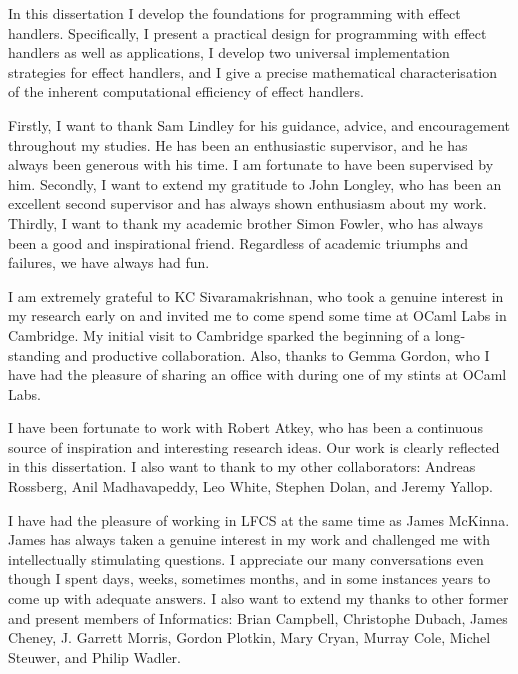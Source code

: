 \documentclass[12pt,phd,lfcs,twoside,openright,logo,leftchapter,normalheadings]{infthesis}
\theoremstyle{plain}
\theoremstyle{definition}
\begin{document}
\begin{preliminary}
\begin{laysummary}
  In this dissertation I develop the foundations for programming with
  effect handlers. Specifically, I present a practical design for
  programming with effect handlers as well as applications, I develop
  two universal implementation strategies for effect handlers, and I
  give a precise mathematical characterisation of the inherent
  computational efficiency of effect handlers.
\end{laysummary}

\begin{acknowledgements}
  Firstly, I want to thank Sam Lindley for his guidance, advice, and
  encouragement throughout my studies. He has been an enthusiastic
  supervisor, and he has always been generous with his time. I am
  fortunate to have been supervised by him.
  Secondly, I want to extend my gratitude to John Longley, who has
  been an excellent second supervisor and has always shown enthusiasm
  about my work.
  Thirdly, I want to thank my academic brother Simon Fowler, who has
  always been a good and inspirational friend. Regardless of academic
  triumphs and failures, we have always had fun.

  I am extremely grateful to KC Sivaramakrishnan, who took a genuine
  interest in my research early on and invited me to come spend some
  time at OCaml Labs in Cambridge. My initial visit to Cambridge
  sparked the beginning of a long-standing and productive
  collaboration. Also, thanks to Gemma Gordon, who I have had the
  pleasure of sharing an office with during one of my stints at OCaml
  Labs.

  I have been fortunate to work with Robert Atkey, who has been a
  continuous source of inspiration and interesting research ideas. Our
  work is clearly reflected in this dissertation.
  I also want to thank to my other collaborators: Andreas Rossberg,
  Anil Madhavapeddy, Leo White, Stephen Dolan, and Jeremy Yallop.

  I have had the pleasure of working in LFCS at the same time as James
  McKinna. James has always taken a genuine interest in my work and
  challenged me with intellectually stimulating questions. I
  appreciate our many conversations even though I spent days, weeks,
  sometimes months, and in some instances years to come up with
  adequate answers. I also want to extend my thanks to other former
  and present members of Informatics: Brian Campbell, Christophe
  Dubach, James Cheney, J. Garrett Morris, Gordon Plotkin, Mary Cryan,
  Murray Cole, Michel Steuwer, and Philip Wadler.


\end{acknowledgements}
\end{preliminary}
\end{document}
